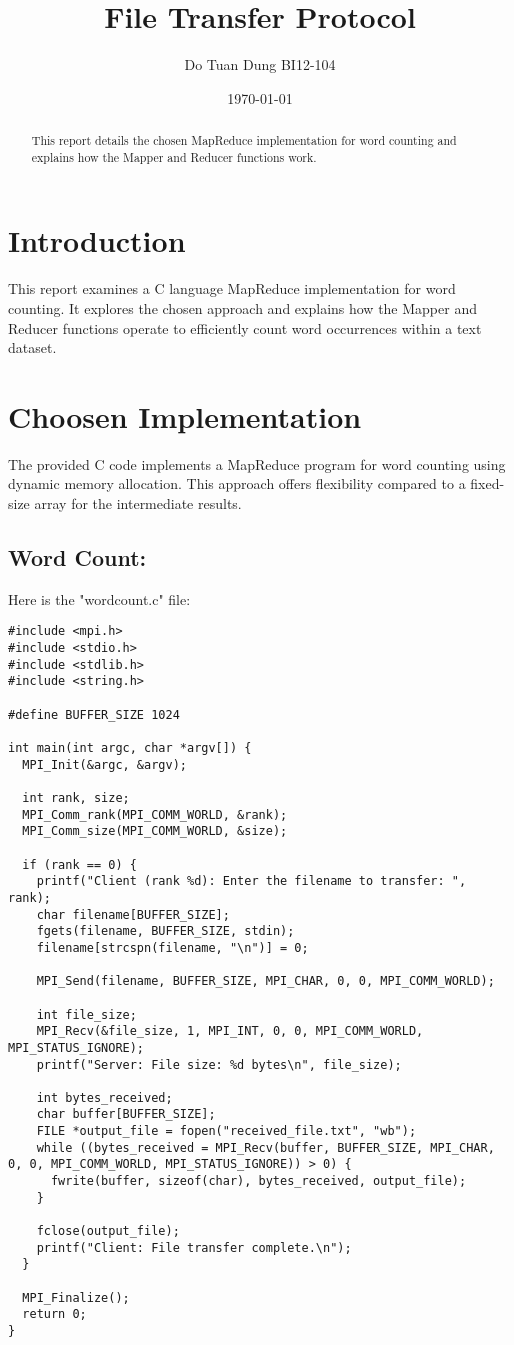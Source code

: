 \documentclass{article}
\title{File Transfer Protocol}
\author{Do Tuan Dung BI12-104}
\date{\today}
\begin{document}
\maketitle

\begin{abstract}
This report details the chosen MapReduce implementation for word counting and explains how the Mapper and Reducer functions work.
\end{abstract}

\section{Introduction}

This report examines a C language MapReduce implementation for word counting. It explores the chosen approach and explains how the Mapper and Reducer functions operate to efficiently count word occurrences within a text dataset.

\section{Choosen Implementation}
The provided C code implements a MapReduce program for word counting using dynamic memory allocation. This approach offers flexibility compared to a fixed-size array for the intermediate results.
\subsection{Word Count:}
 Here is the "wordcount.c" file:
\begin{verbatim}
#include <mpi.h>
#include <stdio.h>
#include <stdlib.h>
#include <string.h>

#define BUFFER_SIZE 1024

int main(int argc, char *argv[]) {
  MPI_Init(&argc, &argv);

  int rank, size;
  MPI_Comm_rank(MPI_COMM_WORLD, &rank);
  MPI_Comm_size(MPI_COMM_WORLD, &size);

  if (rank == 0) {
    printf("Client (rank %d): Enter the filename to transfer: ", rank);
    char filename[BUFFER_SIZE];
    fgets(filename, BUFFER_SIZE, stdin);
    filename[strcspn(filename, "\n")] = 0; 

    MPI_Send(filename, BUFFER_SIZE, MPI_CHAR, 0, 0, MPI_COMM_WORLD);

    int file_size;
    MPI_Recv(&file_size, 1, MPI_INT, 0, 0, MPI_COMM_WORLD, MPI_STATUS_IGNORE);
    printf("Server: File size: %d bytes\n", file_size); 

    int bytes_received;
    char buffer[BUFFER_SIZE];
    FILE *output_file = fopen("received_file.txt", "wb");  
    while ((bytes_received = MPI_Recv(buffer, BUFFER_SIZE, MPI_CHAR, 0, 0, MPI_COMM_WORLD, MPI_STATUS_IGNORE)) > 0) {
      fwrite(buffer, sizeof(char), bytes_received, output_file);
    }

    fclose(output_file);
    printf("Client: File transfer complete.\n");
  }

  MPI_Finalize();
  return 0;
}

\end{verbatim}
\end{document}
